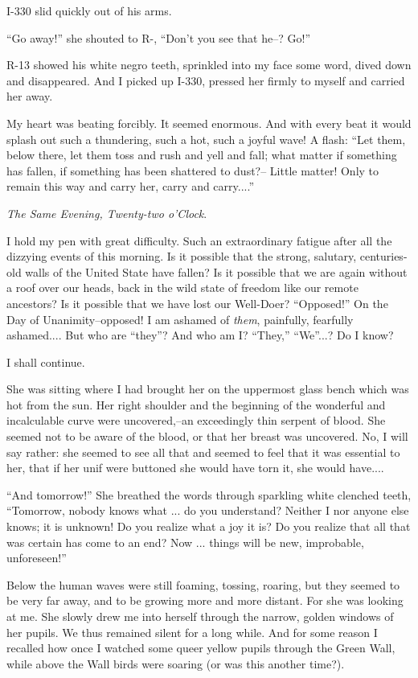 \documentclass[11pt,openany]{book}
\begin{document}
I-330 slid quickly out of his arms.

``Go away!'' she shouted to R-, ``Don't you see that he--? Go!''

R-13 showed his white negro teeth, sprinkled into my face some word, dived down and disappeared. And I picked up I-330, pressed her firmly to myself and carried her away.

My heart was beating forcibly. It seemed enormous. And with every beat it would splash out such a thundering, such a hot, such a joyful wave! A flash: ``Let them, below there, let them toss and rush and yell and fall; what matter if something has fallen, if something has been shattered to dust?-- Little matter! Only to remain this way and carry her, carry and carry....''

\emph{The Same Evening, Twenty-two o'Clock}.

I hold my pen with great difficulty. Such an extraordinary fatigue after all the dizzying events of this morning. Is it possible that the strong, salutary, centuries-old walls of the United State have fallen? Is it possible that we are again without a roof over our heads, back in the wild state of freedom like our remote ancestors? Is it possible that we have lost our Well-Doer? ``Opposed!'' On the Day of Unanimity--opposed! I am ashamed of \emph{them}, painfully, fearfully ashamed.... But who are ``they''? And who am I? ``They,'' ``We''...? Do I know?

I shall continue.

She was sitting where I had brought her on the uppermost glass bench which was hot from the sun. Her right shoulder and the beginning of the wonderful and incalculable curve were uncovered,--an exceedingly thin serpent of blood. She seemed not to be aware of the blood, or that her breast was uncovered. No, I will say rather: she seemed to see all that and seemed to feel that it was essential to her, that if her unif were buttoned she would have torn it, she would have....

``And tomorrow!'' She breathed the words through sparkling white clenched teeth, ``Tomorrow, nobody knows what ... do you understand? Neither I nor anyone else knows; it is unknown! Do you realize what a joy it is? Do you realize that all that was certain has come to an end? Now ... things will be new, improbable, unforeseen!''

Below the human waves were still foaming, tossing, roaring, but they seemed to be very far away, and to be growing more and more distant. For she was looking at me. She slowly drew me into herself through the narrow, golden windows of her pupils. We thus remained silent for a long while. And for some reason I recalled how once I watched some queer yellow pupils through the Green Wall, while above the Wall birds were soaring (or was this another time?).
\end{document}
